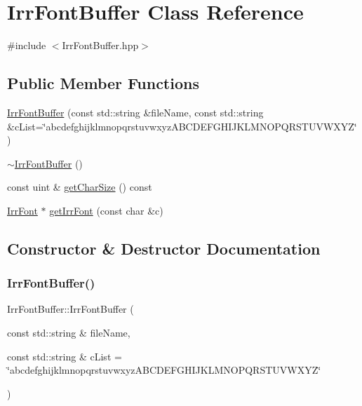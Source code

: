 \hypertarget{class_irr_font_buffer}{}\section{Irr\+Font\+Buffer Class Reference}
\label{class_irr_font_buffer}


{\ttfamily \#include $<$Irr\+Font\+Buffer.\+hpp$>$}

\subsection*{Public Member Functions}
\begin{DoxyCompactItemize}
\item 
\mbox{\hyperlink{class_irr_font_buffer_a04107efaceddaeca94a3e6cb5420d256}{Irr\+Font\+Buffer}} (const std\+::string \&file\+Name, const std\+::string \&c\+List=\char`\"{}abcdefghijklmnopqrstuvwxyz\+A\+B\+C\+D\+E\+F\+G\+H\+I\+J\+K\+L\+M\+N\+O\+P\+Q\+R\+S\+T\+U\+V\+W\+X\+YZ\char`\"{})
\item 
\mbox{\hyperlink{class_irr_font_buffer_a72c1f4bfdd9845cd40759a38804985e6}{$\sim$\+Irr\+Font\+Buffer}} ()
\item 
const uint \& \mbox{\hyperlink{class_irr_font_buffer_aac3084fd3f7ff2ecdcb8017718e735ef}{get\+Char\+Size}} () const
\item 
\mbox{\hyperlink{class_irr_font}{Irr\+Font}} $\ast$ \mbox{\hyperlink{class_irr_font_buffer_a4a740aaaee5853aee7af7d49ddca3f00}{get\+Irr\+Font}} (const char \&c)
\end{DoxyCompactItemize}


\subsection{Constructor \& Destructor Documentation}
\mbox{\label{class_irr_font_buffer_a04107efaceddaeca94a3e6cb5420d256}} 
\subsubsection{\texorpdfstring{IrrFontBuffer()}{IrrFontBuffer()}}
{\footnotesize\ttfamily Irr\+Font\+Buffer\+::\+Irr\+Font\+Buffer (\begin{DoxyParamCaption}\item[{const std\+::string \&}]{file\+Name,  }\item[{const std\+::string \&}]{c\+List = {\ttfamily \char`\"{}abcdefghijklmnopqrstuvwxyzABCDEFGHIJKLMNOPQRSTUVWXYZ\char`\"{}} }\end{DoxyParamCaption})\hspace{0.3cm}{\ttfamily [explicit]}}

